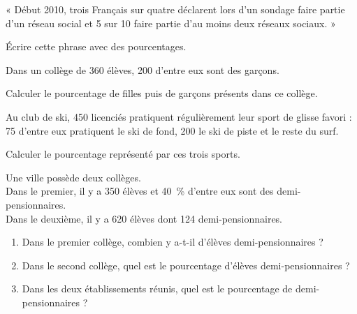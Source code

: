 \documentclass[a4paper]{book}
\begin{document}
    \begin{exercice}
        « Début 2010, trois Français sur quatre déclarent lors d'un sondage faire partie d'un réseau social et 5 sur 10 faire partie d'au moins deux réseaux sociaux. » 
        
        Écrire cette phrase avec des pourcentages.
    \end{exercice}


    \begin{exercice}
        Dans un collège de 360 élèves, 200 d'entre eux sont des garçons.
        
        Calculer le pourcentage de filles puis de garçons présents dans ce collège.
    \end{exercice}


    \begin{exercice}
        Au club de ski, 450 licenciés pratiquent régulièrement leur sport de glisse favori : 75 d'entre eux pratiquent le ski de fond, 200 le ski de piste et le reste du surf. 
        
        Calculer le pourcentage représenté par ces trois sports.
    \end{exercice}


    \begin{exercice}
        Une ville possède deux collèges. \\
        Dans le premier, il y a 350 élèves et 40~\% d'entre eux sont des demi-pensionnaires. \\
        Dans le deuxième, il y a 620 élèves dont 124 demi-pensionnaires.
        
        \begin{enumerate}
            \item Dans le premier collège, combien y a-t-il d'élèves demi-pensionnaires ?
            \item Dans le second collège, quel est le pourcentage d'élèves demi-pensionnaires ?
            \item Dans les deux établissements réunis, quel est le pourcentage de demi-pensionnaires ?
        \end{enumerate}
    \end{exercice}
\end{document}
